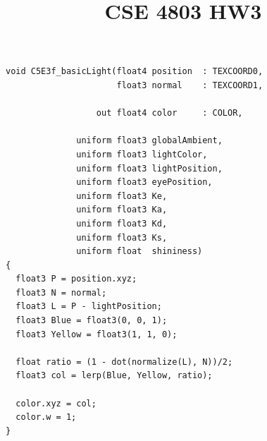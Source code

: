 \documentclass[letterpaper,11pt]{article}
\title{CSE 4803 HW3}
\begin{document}
\begin{verbatim}
void C5E3f_basicLight(float4 position  : TEXCOORD0,                        
                      float3 normal    : TEXCOORD1,

                  out float4 color     : COLOR,

              uniform float3 globalAmbient,
              uniform float3 lightColor,
              uniform float3 lightPosition,
              uniform float3 eyePosition,
              uniform float3 Ke,
              uniform float3 Ka,
              uniform float3 Kd,
              uniform float3 Ks,
              uniform float  shininess)
{
  float3 P = position.xyz;
  float3 N = normal;
  float3 L = P - lightPosition;
  float3 Blue = float3(0, 0, 1);
  float3 Yellow = float3(1, 1, 0);

  float ratio = (1 - dot(normalize(L), N))/2;
  float3 col = lerp(Blue, Yellow, ratio);

  color.xyz = col;
  color.w = 1;
}
\end{verbatim}
\end{document}
